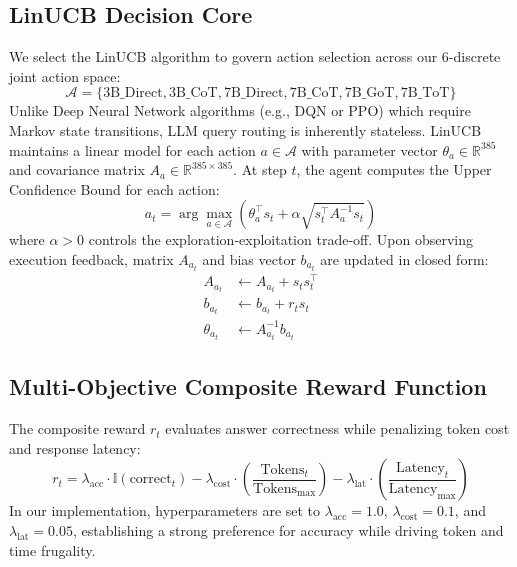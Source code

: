 \documentclass[pdflatex,sn-mathphys-num]{sn-jnl}%
\theoremstyle{thmstyleone}%
\theoremstyle{thmstyletwo}%
\theoremstyle{thmstylethree}%
\begin{document}
\subsection{LinUCB Decision Core}
We select the LinUCB algorithm \cite{li2010contextual} to govern action selection across our 6-discrete joint action space:
\begin{equation}
\mathcal{A} = \{ \text{3B\_Direct}, \text{3B\_CoT}, \text{7B\_Direct}, \text{7B\_CoT}, \text{7B\_GoT}, \text{7B\_ToT} \}
\end{equation}
Unlike Deep Neural Network algorithms (e.g., DQN or PPO) which require Markov state transitions, LLM query routing is inherently stateless. LinUCB maintains a linear model for each action $a \in \mathcal{A}$ with parameter vector $\theta_a \in \mathbb{R}^{385}$ and covariance matrix $A_a \in \mathbb{R}^{385 \times 385}$. At step $t$, the agent computes the Upper Confidence Bound for each action:
\begin{equation}
a_t = \arg\max_{a \in \mathcal{A}} \left( \theta_a^\top s_t + \alpha \sqrt{s_t^\top A_a^{-1} s_t} \right)
\end{equation}
where $\alpha > 0$ controls the exploration-exploitation trade-off. Upon observing execution feedback, matrix $A_{a_t}$ and bias vector $b_{a_t}$ are updated in closed form:
\begin{align}
A_{a_t} &\leftarrow A_{a_t} + s_t s_t^\top \\
b_{a_t} &\leftarrow b_{a_t} + r_t s_t \\
\theta_{a_t} &\leftarrow A_{a_t}^{-1} b_{a_t}
\end{align}

\subsection{Multi-Objective Composite Reward Function}
The composite reward $r_t$ evaluates answer correctness while penalizing token cost and response latency:
\begin{equation}
r_t = \lambda_{\text{acc}} \cdot \mathbb{I}(\text{correct}_t) - \lambda_{\text{cost}} \cdot \left(\frac{\text{Tokens}_t}{\text{Tokens}_{\max}}\right) - \lambda_{\text{lat}} \cdot \left(\frac{\text{Latency}_t}{\text{Latency}_{\max}}\right)
\end{equation}
In our implementation, hyperparameters are set to $\lambda_{\text{acc}} = 1.0$, $\lambda_{\text{cost}} = 0.1$, and $\lambda_{\text{lat}} = 0.05$, establishing a strong preference for accuracy while driving token and time frugality.
\end{document}
